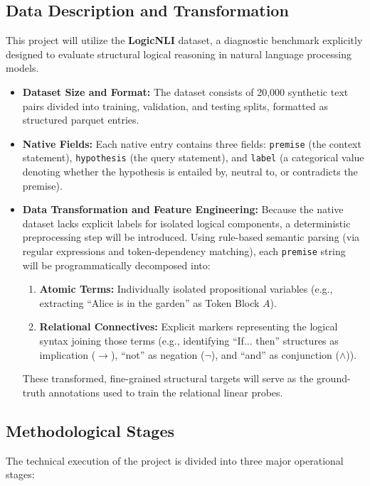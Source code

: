 \documentclass[12 pt]{article}  %
\begin{document}
\subsection{Data Description and Transformation}
This project will utilize the \textbf{LogicNLI} dataset\cite{tian-etal-2021-diagnosing}, a diagnostic benchmark explicitly designed to evaluate structural logical reasoning in natural language processing models. 
\begin{itemize}
    \item \textbf{Dataset Size and Format:} The dataset consists of 20,000 synthetic text pairs divided into training, validation, and testing splits, formatted as structured parquet entries.
    \item \textbf{Native Fields:} Each native entry contains three fields: \texttt{premise} (the context statement), \texttt{hypothesis} (the query statement), and \texttt{label} (a categorical value denoting whether the hypothesis is entailed by, neutral to, or contradicts the premise).
    \item \textbf{Data Transformation and Feature Engineering:} Because the native dataset lacks explicit labels for isolated logical components, a deterministic preprocessing step will be introduced. Using rule-based semantic parsing (via regular expressions and token-dependency matching), each \texttt{premise} string will be programmatically decomposed into:
    \begin{enumerate}
        \item \textbf{Atomic Terms:} Individually isolated propositional variables (e.g., extracting ``Alice is in the garden'' as Token Block $A$).
        \item \textbf{Relational Connectives:} Explicit markers representing the logical syntax joining those terms (e.g., identifying ``If... then'' structures as implication ($\rightarrow$), ``not'' as negation ($\neg$), and ``and'' as conjunction ($\land$)).
    \end{enumerate}
    These transformed, fine-grained structural targets will serve as the ground-truth annotations used to train the relational linear probes.
\end{itemize}

\subsection{Methodological Stages}
The technical execution of the project is divided into three major operational stages:
\end{document}
